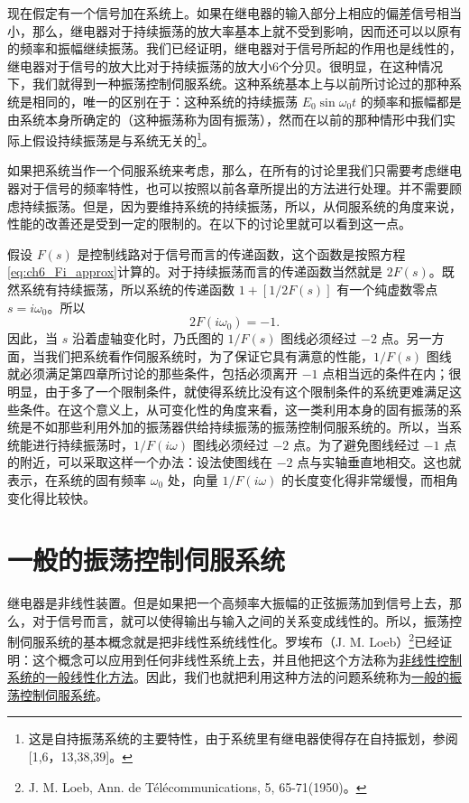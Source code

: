 现在假定有一个信号加在系统上。如果在继电器的输入部分上相应的偏差信号相当小，那么，继电器对于持续振荡的放大率基本上就不受到影响，因而还可以以原有的频率和振幅继续振荡。我们已经证明，继电器对于信号所起的作用也是线性的，继电器对于信号的放大比对于持续振荡的放大小6个分贝。很明显，在这种情况下，我们就得到一种振荡控制伺服系统。这种系统基本上与以前所讨论过的那种系统是相同的，唯一的区别在于：这种系统的持续振荡 $E_0 \sin \omega_0 t$ 的频率和振幅都是由系统本身所确定的（这种振荡称为固有振荡），然而在以前的那种情形中我们实际上假设持续振荡是与系统无关的\footnote{这是自持振荡系统的主要特性，由于系统里有继电器使得存在自持振划，参阅[1,6，13,38,39]。}。

如果把系统当作一个伺服系统来考虑，那么，在所有的讨论里我们只需要考虑继电器对于信号的频率特性，也可以按照以前各章所提出的方法进行处理。并不需要顾虑持续振荡。但是，因为要维持系统的持续振荡，所以，从伺服系统的角度来说，性能的改善还是受到一定的限制的。在以下的讨论里就可以看到这一点。

假设 $F(s)$ 是控制线路对于信号而言的传递函数，这个函数是按照方程\eqref{eq:ch6_Fi_approx}计算的。对于持续振荡而言的传递函数当然就是 $2F(s)$。既然系统有持续振荡，所以系统的传递函数 $1 + [1/2F(s)]$ 有一个纯虚数零点 $s = i\omega_0$。所以
\begin{equation*}
2F(i\omega_0) = -1.
\end{equation*}
因此，当 $s$ 沿着虚轴变化时，乃氏图的 $1/F(s)$ 图线必须经过 $-2$ 点。另一方面，当我们把系统看作伺服系统时，为了保证它具有满意的性能，$1/F(s)$ 图线就必须满足第四章所讨论的那些条件，包括必须离开 $-1$ 点相当远的条件在内；很明显，由于多了一个限制条件，就使得系统比没有这个限制条件的系统更难满足这些条件。在这个意义上，从可变化性的角度来看，这一类利用本身的固有振荡的系统是不如那些利用外加的振荡器供给持续振荡的振荡控制伺服系统的。所以，当系统能进行持续振荡时，$1/F(i\omega)$ 图线必须经过 $-2$ 点。为了避免图线经过 $-1$ 点的附近，可以采取这样一个办法：设法使图线在 $-2$ 点与实轴垂直地相交。这也就表示，在系统的固有频率 $\omega_0$ 处，向量 $1/F(i\omega)$ 的长度变化得非常缓慢，而相角变化得比较快。

\section{一般的振荡控制伺服系统}

继电器是非线性装置。但是如果把一个高频率大振幅的正弦振荡加到信号上去，那么，对于信号而言，就可以使得输出与输入之间的关系变成线性的。所以，振荡控制伺服系统的基本概念就是把非线性系统线性化。罗埃布（J. M. Loeb）\footnote{J. M. Loeb, Ann. de Télécommunications, 5, 65-71(1950)。}已经证明：这个概念可以应用到任何非线性系统上去，并且他把这个方法称为\underline{非线性控制系统的一般线性化方法}。因此，我们也就把利用这种方法的问题系统称为\underline{一般的振荡控制伺服系统}。

